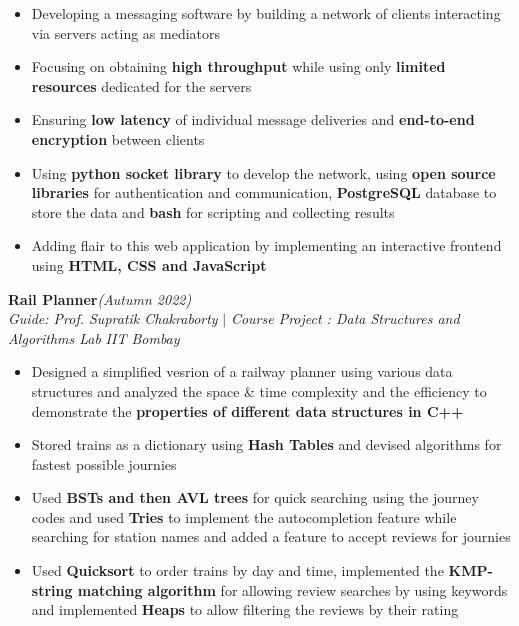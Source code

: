 \documentclass[a4paper,10pt]{article}
\begin{document}
\vspace{-15pt}
\begin{itemize}[itemsep = -0.65 mm, leftmargin=*]
    \item Developing a messaging software by building a network of clients interacting via servers acting as mediators
    \item Focusing on obtaining \textbf{high throughput} while using only \textbf{limited resources} dedicated for the servers
    \item Ensuring \textbf{low latency} of individual message deliveries and \textbf{end-to-end encryption} between clients
    \item Using \textbf{python socket library} to develop the network, using \textbf{open source libraries} for authentication and communication, \textbf{PostgreSQL} database to store the data and \textbf{bash} for scripting and collecting results
    \item Adding flair to this web application by implementing an interactive frontend using \textbf{HTML, CSS and JavaScript}
\end{itemize}
\vspace{\baselineskip}
\vspace{-10pt}
\noindent\textbf{\large Rail Planner}\hfill{\sl \small (Autumn 2022)}\\
{\it Guide: Prof. Supratik Chakraborty} $|$ {\it Course Project : Data Structures and Algorithms Lab} \hfill{\it IIT Bombay}
\\\vspace{-15pt}
\begin{itemize}[itemsep = -0.65 mm, leftmargin=*]
    \item Designed a simplified vesrion of a railway planner using various data structures and analyzed the space \& time complexity and the efficiency to demonstrate the \textbf{properties of different data structures in C++}
    \item Stored trains as a dictionary using \textbf{Hash Tables} and devised algorithms for fastest possible journies
    \item Used \textbf{BSTs and then AVL trees} for quick searching using the journey codes and used \textbf{Tries} to implement the autocompletion feature while searching for station names and added a feature to accept reviews for journies
    \item Used \textbf{Quicksort} to order trains by day and time, implemented the \textbf{KMP-string matching algorithm} for allowing review searches by using keywords and implemented \textbf{Heaps} to allow filtering the reviews by their rating
\end{itemize}
\end{document}
